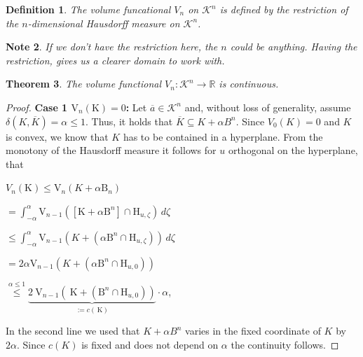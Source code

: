 \documentclass[a4paper]{book}
\newtheorem{theorem}{Theorem}%
\newtheorem{note}[theorem]{Note}%
\newtheorem{definition}[theorem]{Definition}%
\numberwithin{theorem}{section}%
\begin{document}
\begin{definition}
    The volume funcational $V_{n}$ on $\mathscr{K}^{n}$ is defined by the restriction of the $n$-dimensional Hausdorff measure on $\mathscr{K}^{n}$.
\end{definition}

\begin{note}
    If we don't have the restriction here, the $n$ could be anything. Having the restriction, gives us a clearer domain to work with.
\end{note}

\begin{theorem}
    The volume functional $V_{n}:\mathscr{K}^{n}\to\mathbb{R}$ is continuous.
\end{theorem}
\begin{proof}
    \textbf{Case 1 $\mathrm{V}_{n}(\mathrm{K})=0$:}
    Let $\overline{a}\in\mathscr{K}^{n}$ and, without loss of generality, assume $\delta(K,\overline{K})=\alpha\leq1$. Thus, it holds that $\overline{K}\subseteq K+\alpha B^{n}$. Since $V_{0}(K)=0$ and $K$ is convex, we know that $K$ has to be contained in a hyperplane. From the monotony of the Hausdorff measure it follows for $u$ orthogonal on the hyperplane, that
    \begin{center}
        $\displaystyle V_{n}(\mathrm{K})\leq \mathrm{V}_{n}(K+\alpha \mathrm{B}_{n})$

        $\displaystyle =\int_{-\alpha}^{\alpha}\mathrm{V}_{n-1}([\mathrm{K}+\alpha \mathrm{B}^{n}]\cap\mathrm{H}_{u,\zeta})\,d\zeta$

        $\displaystyle \leq\int_{-\alpha}^{\alpha}\mathrm{V}_{n-1}(K+(\alpha\mathrm{B}^{n}\cap\mathrm{H}_{u,\zeta}))\,d\zeta$

        $\displaystyle =2\alpha \mathrm{V}_{n-1}(K+(\alpha\mathrm{B}^{n}\cap\mathrm{H}_{u,0}))$

        $\displaystyle \overset{\alpha\leq1}{\leq}\underbrace{2\mathrm{~V}_{n-1}\left(\mathrm{~K}+\left(\mathrm{B}^n\cap \mathrm{H}_{u, 0}\right)\right)}_{:=c(\mathrm{~K})}\cdot\alpha$,
    \end{center}
    In the second line we used that $K+\alpha B^{n}$ varies in the fixed coordinate of $K$ by $2\alpha$. Since $c(K)$ is fixed and does not depend on $\alpha$ the continuity follows.


\end{proof}
\end{document}

